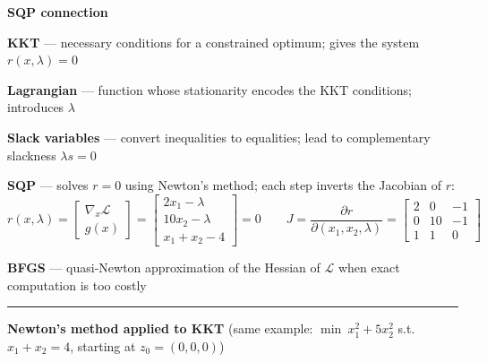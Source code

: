 \documentclass[10pt,a3paper]{article}
\begin{document}
\begin{minipage}[t]{0.46\linewidth}

\noindent\textbf{SQP connection}

\noindent\textbf{KKT} — necessary conditions for a constrained optimum; gives the system $r(x,\lambda)=0$

\noindent\textbf{Lagrangian} — function whose stationarity encodes the KKT conditions; introduces $\lambda$

\noindent\textbf{Slack variables} — convert inequalities to equalities; lead to complementary slackness $\lambda s = 0$

\noindent\textbf{SQP} — solves $r=0$ using Newton's method; each step inverts the Jacobian of $r$:
\[
  r(x,\lambda) = \begin{bmatrix} \nabla_x \mathcal{L} \\ g(x) \end{bmatrix}
               = \begin{bmatrix} 2x_1-\lambda \\ 10x_2-\lambda \\ x_1+x_2-4 \end{bmatrix} = 0
  \qquad
  J = \frac{\partial r}{\partial(x_1,x_2,\lambda)}
    = \begin{bmatrix} 2 & 0 & -1 \\ 0 & 10 & -1 \\ 1 & 1 & 0 \end{bmatrix}
\]

\noindent\textbf{BFGS} — quasi-Newton approximation of the Hessian of $\mathcal{L}$ when exact computation is too costly

\end{minipage}

\vspace{8pt}

\noindent\rule{\linewidth}{0.4pt}

\vspace{4pt}

\noindent\textbf{Newton's method applied to KKT} (same example: $\min\ x_1^2+5x_2^2$ s.t.\ $x_1+x_2=4$, starting at $z_0=(0,0,0)$)

\vspace{4pt}
\end{document}
